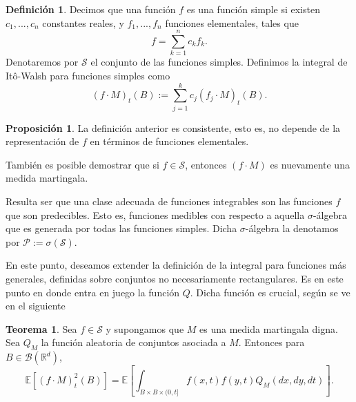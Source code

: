 \documentclass[letterpaper,twoside,12pt]{book}
\newcommand{\R}{\mathbb{R}}
\newcommand{\B}{\mathcal{B}}
\newcommand{\E}{\mathbb{E}}
\newcommand{\1}{\mathds{1}}
\theoremstyle{definition}
\newtheorem{dfn}{Definición}
\theoremstyle{definition}
\newtheorem{teo}{Teorema}
\theoremstyle{remark}
\theoremstyle{definition}
\theoremstyle{definition}
\newtheorem{prop}{Proposición}
\theoremstyle{definition}
\theoremstyle{definition}
\theoremstyle{definition}
\begin{document}
\begin{dfn} 
   Decimos que una función $f$ es una función simple si existen $c_1,...,c_n$ constantes reales, y $f_1,...,f_n$ funciones elementales, tales que 
   \[
     f=\sum_{k=1}^{n}c_kf_k.  
   \] Denotaremos por $\mathscr{S}$ el conjunto de las funciones simples. Definimos la integral de Itô-Walsh para funciones simples como 
   \[
   (f\cdot M)_t(B):=\sum_{j=1}^{k}c_j(f_j\cdot M)_t(B).
   \]
 \end{dfn}
 \begin{prop} 
  La definición anterior es consistente, esto es, no depende de la representación de $f$ en términos de funciones elementales.
  \end{prop}
También es posible demostrar que si $f\in \mathscr{S}$, entonces $(f\cdot M)$ es nuevamente una medida martingala. 

Resulta ser que una clase adecuada de funciones integrables son las funciones $f$ que son predecibles. Esto es, funciones medibles con respecto a aquella $\sigma$-álgebra que es generada por todas las funciones simples. Dicha $\sigma$-álgebra la denotamos por $\mathscr{P}:=\sigma(\mathscr{S})$.

En este punto, deseamos extender la definición de la integral para funciones más generales, definidas sobre conjuntos no necesariamente rectangulares. Es en este punto en donde entra en juego la función $Q$.  Dicha función es crucial, según se ve en el siguiente 

\begin{teo}\label{rolmedidaq}
Sea $f\in \mathscr{S}$ y supongamos que $M$ es una medida martingala digna. Sea $Q_M$ la función aleatoria de conjuntos asociada a $M$. Entonces para $B\in \B(\R^{d})$,
\[
\E\left[(f\cdot M)_t^2(B)\right]=\E\left[\int_{B\times B\times (0,t]}f(x,t)f(y,t)Q_M(dx,dy,dt)\right].   
\]
\end{teo}
\end{document}
